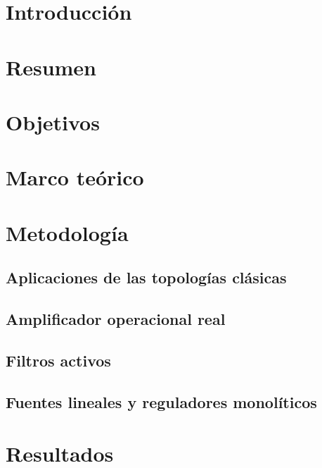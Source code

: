 \documentclass{article}
\begin{document}

\tableofcontents
\newpage
\section{Introducción}


\section{Resumen}


\section{Objetivos}


\section {Marco teórico}





\section{Metodología}
\subsection{Aplicaciones de las topologías clásicas}

\FloatBarrier
\subsection{Amplificador operacional real}

\FloatBarrier
\subsection{Filtros activos}

\FloatBarrier
\subsection{Fuentes lineales y reguladores monolíticos}


\section{Resultados}
\end{document}
